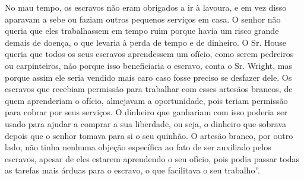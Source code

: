 No mau tempo, os escravos não eram obrigados a ir à lavoura, e em vez
disso aparavam a sebe ou faziam outros pequenos serviços em casa. O
senhor não queria que eles trabalhassem em tempo ruim porque havia um
risco grande demais de doença, o que levaria à perda de tempo e de
dinheiro. O Sr. House queria que todos os seus escravos aprendessem um
ofício, como serem pedreiros ou carpinteiros, não porque isso
beneficiaria o escravo, conta o Sr. Wright, mas porque assim ele seria
vendido mais caro caso fosse preciso se desfazer dele. Os escravos que
recebiam permissão para trabalhar com esses artesãos brancos, de quem
aprenderiam o ofício, almejavam a oportunidade, pois teriam permissão
para cobrar por seus serviços. O dinheiro que ganhariam com isso poderia
ser usado para ajudar a comprar a sua liberdade, ou seja, o dinheiro que
sobrava depois que o senhor tomava para si o seu quinhão. O artesão
branco, por outro lado, não tinha nenhuma objeção específica ao fato de
ser auxiliado pelos escravos, apesar de eles estarem aprendendo o seu
ofício, pois podia passar todas as tarefas mais árduas para o escravo, o
que facilitava o seu trabalho''.

